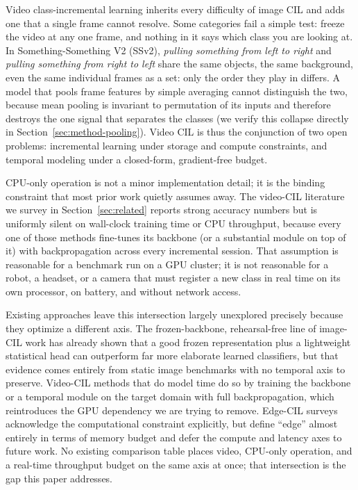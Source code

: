 \documentclass[a4paper,fleqn]{cas-dc}
\begin{document}
Video class-incremental learning inherits every difficulty of image CIL and
adds one that a single frame cannot resolve. Some categories fail a simple
test: freeze the video at any one frame, and nothing in it says which
class you are looking at. In Something-Something V2 (SSv2), \emph{pulling
something from left to right} and \emph{pulling something from right to
left} share the same objects, the same background, even the same
individual frames as a set: only the order they play in differs. A model
that pools
frame features by simple averaging cannot distinguish the two, because mean
pooling is invariant to permutation of its inputs and therefore destroys the
one signal that separates the classes (we verify this collapse directly in
Section~\ref{sec:method-pooling}). Video CIL is thus the conjunction of two
open problems: incremental learning under storage and compute constraints,
and temporal modeling under a closed-form, gradient-free budget.

CPU-only operation is not a minor implementation detail; it is the binding
constraint that most prior work quietly assumes away. The video-CIL
literature we survey in Section~\ref{sec:related} reports strong accuracy
numbers but is uniformly silent on wall-clock training time or CPU
throughput, because every one of those methods fine-tunes its backbone (or a
substantial module on top of it) with backpropagation across every
incremental session. That assumption is reasonable for a benchmark run on a
GPU cluster; it is not reasonable for a robot, a headset, or a camera that
must register a new class in real time on its own processor, on battery, and
without network access.

Existing approaches leave this intersection largely unexplored precisely
because they optimize a different axis. The frozen-backbone,
rehearsal-free line of image-CIL work has already shown that a good frozen
representation plus a lightweight statistical head can outperform far more
elaborate learned classifiers, but that evidence comes entirely from static
image benchmarks with no temporal axis to preserve. Video-CIL methods that
do model time do so by training the backbone or a temporal module on the
target domain with full backpropagation, which reintroduces the GPU
dependency we are trying to remove. Edge-CIL surveys acknowledge the
computational constraint explicitly, but define ``edge'' almost entirely in
terms of memory budget and defer the compute and latency axes to future
work. No existing comparison table places video, CPU-only operation, and a
real-time throughput budget on the same axis at once; that intersection is
the gap this paper addresses.
\end{document}
